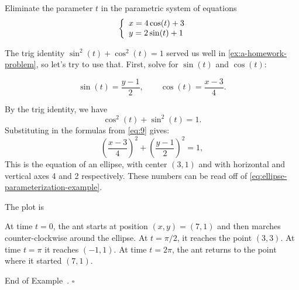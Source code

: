 \documentclass[10pt]{article}
\theoremstyle{definition}
\newtheorem{example}[theorem]{Example}
\renewenvironment{example}
{\begin{oldexample}}
  {\par\smallskip\hfill   End of Example~\theexample. $\square$    \par\end{oldexample}}
\newcommand{\1}[1]{\textbf{1}_{\left[#1\right]}} %
\begin{document}
\begin{example}[Eliminating a parameter]
  \label{ex:eliminating-parameter}
  Eliminate the parameter $t$ in the parametric system of equations
  \begin{equation}\label{eq:ellipse-parameterization-example}
    \left\{ \begin{array}{l@{}l} x=4\cos(t)+3 \\ y=2\sin(t)+1\end{array}\right.
  \end{equation}

  The trig identity $\sin^{2}(t) + \cos^{2}(t)=1$ served us well in \cref{ex:a-homework-problem}, so
  let's try to use that.  First, solve for $\sin(t)$ and $\cos(t)$:

  \begin{equation}\label{eq:9}
    \sin(t) = \frac{y-1}{2}, \qquad \cos(t) = \frac{x-3}{4}.
  \end{equation}

  By the trig identity, we have
  \begin{equation*}
    \cos^{2}(t) + \sin^{2}(t)  = 1.
  \end{equation*}
  Substituting in the formulas from \cref{eq:9} gives:
  \begin{equation*}
    \left( \frac{x-3}{4} \right)^{2} + \left( \frac{y-1}{2} \right)^{2}=1,
  \end{equation*}
  This is the equation of an ellipse, with center $(3,1)$ and with horizontal
  and vertical axes 4 and 2 respectively. These numbers can be read off of
  \cref{eq:ellipse-parameterization-example}.

  The plot is
  \begin{center}
  \end{center}

  At time $t=0$, the ant starts at position $(x,y) = (7,1)$ and then marches
  counter-clockwise around the ellipse. At $t=\pi/2$, it reaches the point
  $(3,3)$. At time $t=\pi$ it reaches $(-1,1)$. At time $t=2\pi$, the ant
  returns to the point where it started $(7,1)$.
\end{example}
\end{document}
